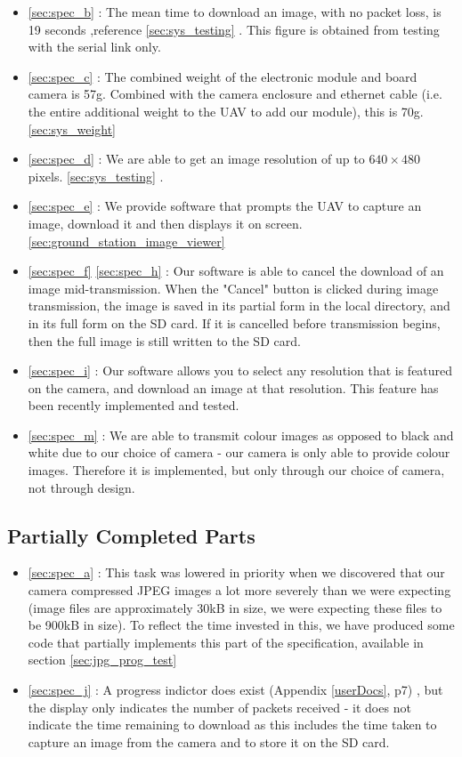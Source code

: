 \begin{itemize}
\item \ref{sec:spec_b} : The mean time to download an image, with no packet 
loss, is 19 seconds ,reference \ref{sec:sys_testing} . This figure is obtained from testing 
with the serial link only.
\item \ref{sec:spec_c} : The combined weight of the electronic module and 
board camera is 57g. Combined with the camera enclosure and ethernet cable 
(i.e. the entire additional weight to the UAV to add our module), this is 70g. \ref{sec:sys_weight}
\item \ref{sec:spec_d} : We are able to get an image resolution of up to 
$640\times480$ pixels. \ref{sec:sys_testing} .
\item \ref{sec:spec_e} : We provide software that prompts the UAV to capture 
an image, download it and then displays it on screen. \ref{sec:ground_station_image_viewer}
\item \ref{sec:spec_f} \ref{sec:spec_h}  : Our software is able to cancel the download of an 
image mid-transmission. When the "Cancel" button is clicked during image transmission, the 
image is saved in its partial form in the local directory, and in its full form 
on the SD card. If it is cancelled before transmission begins, then the full image is still 
written to the SD card.
\item \ref{sec:spec_i} : Our software allows you to select any resolution that 
is featured on the camera, and download an image at that resolution. This feature has been recently 
implemented and tested. 
\item \ref{sec:spec_m} : We are able to transmit colour images as opposed to 
black and white due to our choice of camera - our camera is only able to 
provide colour images. Therefore it is implemented, but only through our 
choice of camera, not through design.
\end{itemize}

\subsection{Partially Completed Parts}

\begin{itemize}
\item \ref{sec:spec_a} : This task was lowered in priority when we discovered 
that our camera compressed JPEG images a lot more severely than we were 
expecting (image files are approximately 30kB in size, we were expecting 
these files to be 900kB in size). To reflect the time invested in this, we 
have produced some code that partially implements this part of the 
specification, available in section \ref{sec:jpg_prog_test}
\item \ref{sec:spec_j} : A progress indictor does exist (Appendix \ref{userDocs}, p7) , but the 
display only indicates the number of packets received - it does not 
indicate the time remaining to download as this includes the time taken to 
capture an image from the camera and to store it on the SD card.
\end{itemize}

